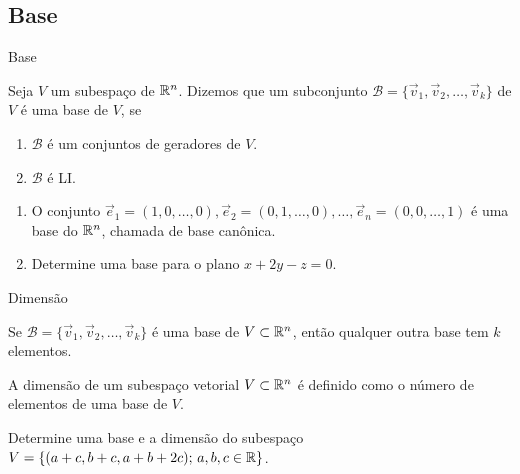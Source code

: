 \subsection*{Base}
\begin{frame}[label=lild]{Base}
\begin{defin}
Seja $V$ um subespaço de $\mathbb{R}^n$. Dizemos que um subconjunto $\mathcal{B}=\{\vec{v}_1,\vec{v}_2,\ldots,\vec{v}_k\}$ de $V$ é uma {\color{blue}base} de $V$, se
\begin{enumerate}
\item $\mathcal{B}$ é um conjuntos de geradores de $V$.
\item $\mathcal{B}$ é LI.
\end{enumerate}
\end{defin}
\begin{exe}
\begin{enumerate}
\item O conjunto $\vec{e}_1=(1,0,\ldots,0), \vec{e}_2=(0,1,\ldots,0),\ldots, \vec{e}_n=(0,0,\ldots,1)$ é uma base do $\mathbb{R}^n$, chamada de {\color{blue}base canônica}.
\item Determine uma base para o plano $x+2y-z=0$.
\end{enumerate}

\end{exe}



\end{frame}

\begin{frame}[label=lild]{Dimensão}

\begin{teo}
Se $\mathcal{B}=\{\vec{v}_1,\vec{v}_2,\ldots,\vec{v}_k\}$ é uma base de $V\subset\mathbb{R}^n$, então qualquer outra base tem $k$ elementos. 
\end{teo}


\begin{defin}
A {\color{blue}dimensão} de um subespaço vetorial $V\subset\mathbb{R}^n$ é definido como o número de elementos de uma base de $V$.
\end{defin}

\begin{exe}
 Determine uma base e a dimensão do subespaço $V=\{(a+c,b+c,a+b+2c);\, a,b,c\in \mathbb{R}\}$.

\end{exe}

\end{frame}





